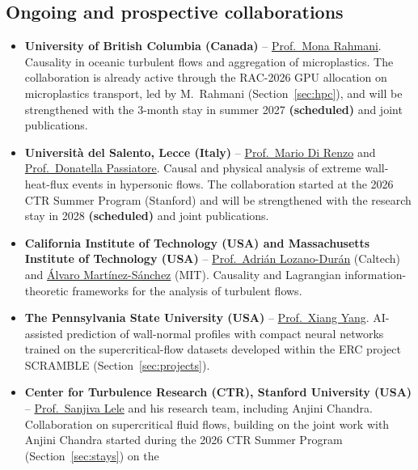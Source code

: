 \documentclass[11pt]{article}
\newcommand{\NEW}[1]{\iffinal #1\else{\color{red}#1}\fi} %
\begin{document}
\subsection{Ongoing \NEW{and prospective} collaborations}\label{sec:collab}
\begin{itemize}
  \item \textbf{University of British Columbia (Canada)} --
  \href{https://chbe.ubc.ca/mona-rahmani/}{Prof.\ Mona Rahmani}. Causality in oceanic
  turbulent flows and aggregation of microplastics. The collaboration is already active
  through the RAC-2026 GPU allocation on microplastics transport, led by M.\ Rahmani
  (Section~\ref{sec:hpc}), and will be strengthened with the 3-month stay in summer 2027 \textbf{(scheduled)}
  and joint publications.
  \item \textbf{Universit\`a del Salento, Lecce (Italy)} --
  \href{https://www.unisalento.it/scheda-utente/-/people/mario.direnzo}{Prof.\ Mario Di Renzo}
  and \href{https://www.unisalento.it/scheda-utente/-/people/donatella.passiatore}{Prof.\ Donatella Passiatore}.
  Causal and physical analysis of extreme wall-heat-flux events in hypersonic flows. The
  collaboration started at the 2026 CTR Summer Program (Stanford) and will be strengthened
  with the research stay in 2028 \textbf{(scheduled)} and joint publications.
  \item \textbf{California Institute of Technology (USA) and Massachusetts Institute of
  Technology (USA)} --
  \href{https://www.eas.caltech.edu/people/adrian-lozano-duran}{Prof.\ Adri\'an
  Lozano-Dur\'an} (Caltech) and
  \href{https://sites.google.com/view/alvaro-martinez-sanchez/about-me}{\'Alvaro
  Mart\'inez-S\'anchez} (MIT). Causality and Lagrangian information-theoretic frameworks
  for the analysis of turbulent flows.
  \item \textbf{The Pennsylvania State University (USA)} --
  \href{https://www.me.psu.edu/department/directory-detail-g.aspx?q=xzy48}{Prof.\ Xiang
  Yang}. AI-assisted prediction of wall-normal profiles with compact neural networks
  trained on the supercritical-flow datasets developed within the ERC project SCRAMBLE
  (Section~\ref{sec:projects}).
  \item \textbf{Center for Turbulence Research (CTR), Stanford University (USA)} --
  \href{https://me.stanford.edu/people/sanjiva-lele}{Prof.\ Sanjiva Lele} and his research team,
  including Anjini Chandra. Collaboration on supercritical fluid flows, building on the joint work
  with Anjini Chandra started during the 2026 CTR Summer Program (Section~\ref{sec:stays}) on the

\end{itemize}
\end{document}
